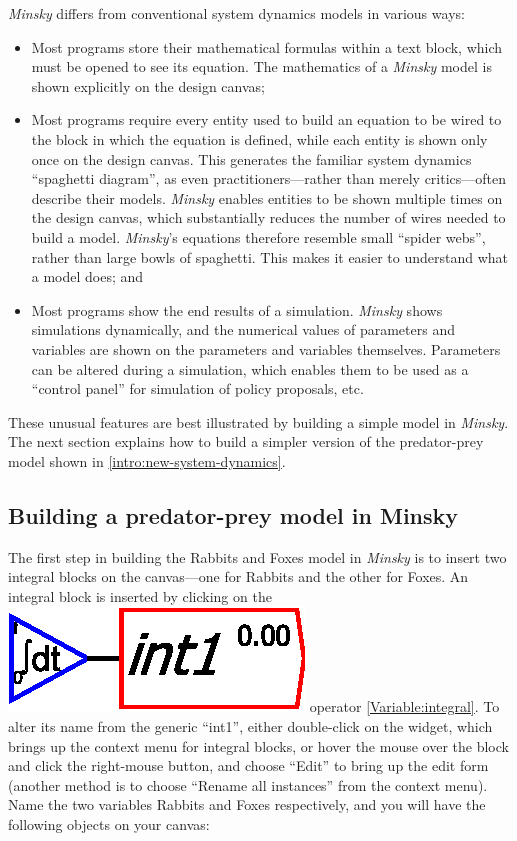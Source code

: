 \emph{Minsky} differs from conventional system dynamics models in
various ways:
\begin{itemize}
\item Most programs store their mathematical formulas within a text block,
which must be opened to see its equation. The mathematics of a \emph{Minsky}
model is shown explicitly on the design canvas;
\item Most programs require every entity used to build an equation to be
wired to the block in which the equation is defined, while each entity
is shown only once on the design canvas. This generates the familiar
system dynamics ``spaghetti diagram'', as even practitioners---rather
than merely critics---often describe their models. \emph{Minsky}
enables entities to be shown multiple times on the design canvas,
which substantially reduces the number of wires needed to build a
model. \emph{Minsky}'s equations therefore resemble small ``spider
webs'', rather than large bowls of spaghetti. This makes it easier
to understand what a model does; and
\item Most programs show the end results of a simulation. \emph{Minsky}
shows simulations dynamically, and the numerical values of parameters
and variables are shown on the parameters and variables themselves.
Parameters can be altered during a simulation, which enables them
to be used as a ``control panel'' for simulation of policy proposals,
etc.
\end{itemize}
These unusual features are best illustrated by building a simple model
in \emph{Minsky}. The next section explains how to build a simpler
version of the predator-prey model shown in \ref{intro:new-system-dynamics}.

\subsection{Building a predator-prey model in Minsky}

\label{Minsky model building}

The first step in building the Rabbits and Foxes model in \emph{Minsky}
is to insert two integral blocks on the canvas---one for Rabbits
and the other for Foxes. An integral block is inserted by clicking
on the \includegraphics{images/integral} operator \ref{Variable:integral}.
To alter its name from the generic ``int1'', either double-click
on the widget, which brings up the context menu for integral blocks,
or hover the mouse over the block and click the right-mouse button,
and choose ``Edit'' to bring up the edit form (another method is
to choose ``Rename all instances'' from the context menu). Name
the two variables Rabbits and Foxes respectively, and you will have
the following objects on your canvas:

